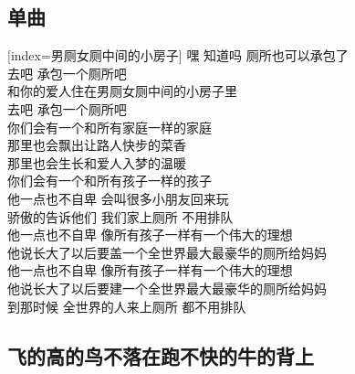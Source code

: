 
	

\subsection{单曲}

\begin{songs}{}
  [index={男厕女厕中间的小房子}]
    嘿 知道吗 厕所也可以承包了	\\
	去吧 承包一个厕所吧	\\		
	和你的爱人住在男厕女厕中间的小房子里	\\
	去吧 承包一个厕所吧	\\
	你们会有一个和所有家庭一样的家庭	\\
	那里也会飘出让路人快步的菜香	\\
	那里也会生长和爱人入梦的温暖	\\
	你们会有一个和所有孩子一样的孩子	\\
	他一点也不自卑 会叫很多小朋友回来玩	\\
	骄傲的告诉他们 我们家上厕所 不用排队	\\
	他一点也不自卑 像所有孩子一样有一个伟大的理想	\\
	他说长大了以后要盖一个全世界最大最豪华的厕所给妈妈	\\
	他一点也不自卑 像所有孩子一样有一个伟大的理想	\\
	他说长大了以后要建一个全世界最大最豪华的厕所给妈妈	\\
	到那时候 全世界的人来上厕所 都不用排队	\\
  \endsong
\end{songs}

\subsection{飞的高的鸟不落在跑不快的牛的背上}

